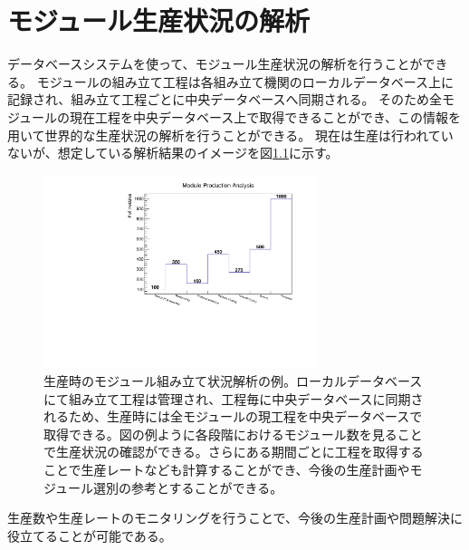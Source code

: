 \chapter{モジュール生産状況の解析}

データベースシステムを使って、モジュール生産状況の解析を行うことができる。
モジュールの組み立て工程は各組み立て機関のローカルデータベース上に記録され、組み立て工程ごとに中央データベースへ同期される。
そのため全モジュールの現在工程を中央データベース上で取得できることができ、この情報を用いて世界的な生産状況の解析を行うことができる。
現在は生産は行われていないが、想定している解析結果のイメージを図\ref{production_analysis}に示す。

\begin{figure}[bpt]\centering
\includegraphics[width=8cm,angle=270]{./production_analysis.pdf}
\caption[生産時のモジュール組み立て状況解析の例]{生産時のモジュール組み立て状況解析の例。ローカルデータベースにて組み立て工程は管理され、工程毎に中央データベースに同期されるため、生産時には全モジュールの現工程を中央データベースで取得できる。図の例ように各段階におけるモジュール数を見ることで生産状況の確認ができる。さらにある期間ごとに工程を取得することで生産レートなども計算することができ、今後の生産計画やモジュール選別の参考とすることができる。}
\label{production_analysis}
\end{figure}

生産数や生産レートのモニタリングを行うことで、今後の生産計画や問題解決に役立てることが可能である。

